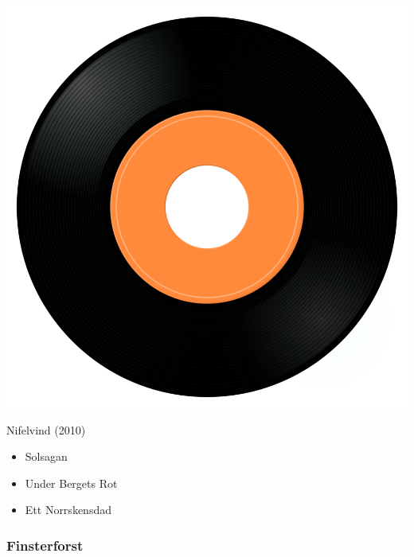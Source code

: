\begin{minipage}[t]{0.25\textwidth}\vspace{0pt}
\captionsetup{type=figure}
\includegraphics[width=\textwidth]{Images/cover.png}
\caption*{Nifelvind (2010)}
\end{minipage}
\begin{minipage}[t]{0.25\textwidth}\vspace{0pt}
\begin{itemize}[nosep,leftmargin=1em,labelwidth=*,align=left]
	\setlength{\itemsep}{0pt}
	\item Solsagan
	\item Under Bergets Rot
	\item Ett Norrskensdad
\end{itemize}
\end{minipage}

\subsubsection{Finsterforst}

